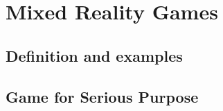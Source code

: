 \section{Mixed Reality Games}\label{ch:game}

\subsection{Definition and examples}

\subsection{Game for Serious Purpose}